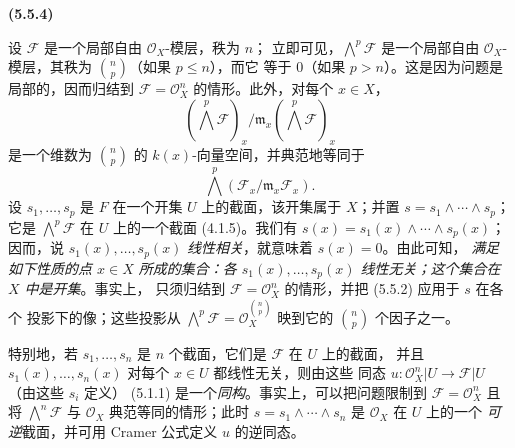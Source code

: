 \documentclass[UTF8,fontset=none,11pt,oneside,openany]{ctexbook}
\newenvironment{env}[1][]{%
  \par\medskip\noindent\textbf{(#1)}\ %
}{\par}
\let\EGAOriginalLabel\label
\renewcommand{\label}[1]{\phantomsection\EGAOriginalLabel{#1}}
\begin{document}
\begin{env}[5.5.4]
\label{0.5.5.4-fr}
设 $\mathcal{F}$ 是一个局部自由 $\mathcal{O}_X$-模层，秩为 $n$；
立即可见，$\bigwedge^p\mathcal{F}$ 是一个局部自由
$\mathcal{O}_X$-模层，其秩为 $\binom{n}{p}$（如果 $p\leq n$），而它
等于 $0$（如果 $p>n$）。这是因为问题是局部的，因而归结到
$\mathcal{F}=\mathcal{O}_X^n$ 的情形。此外，对每个 $x\in X$，
\[
  (\bigwedge^p\mathcal{F})_x/
  \mathfrak{m}_x(\bigwedge^p\mathcal{F})_x
\]
是一个维数为 $\binom{n}{p}$ 的 $k(x)$-向量空间，并典范地等同于
\[
  \bigwedge^p(\mathcal{F}_x/\mathfrak{m}_x\mathcal{F}_x).
\]
设 $s_1,\ldots,s_p$ 是
$F$ 在一个开集 $U$ 上的截面，该开集属于 $X$；并置
$s=s_1\wedge\cdots\wedge s_p$；它是
$\bigwedge^p\mathcal{F}$ 在 $U$ 上的一个截面 (4.1.5)。我们有
$s(x)=s_1(x)\wedge\cdots\wedge s_p(x)$；因而，说
$s_1(x),\ldots,s_p(x)$ \emph{线性相关}，就意味着 $s(x)=0$。由此可知，
\emph{满足如下性质的点 $x\in X$ 所成的集合：各
$s_1(x),\ldots,s_p(x)$ 线性无关；这个集合在 $X$ 中是开集}。事实上，
只须归结到
$\mathcal{F}=\mathcal{O}_X^n$ 的情形，并把 (5.5.2) 应用于 $s$ 在各个
投影下的像；这些投影从
$\bigwedge^p\mathcal{F}=\mathcal{O}_X^{\binom{n}{p}}$ 映到它的
$\binom{n}{p}$ 个因子之一。

特别地，若 $s_1,\ldots,s_n$ 是 $n$ 个截面，它们是 $\mathcal{F}$ 在
$U$ 上的截面，
并且 $s_1(x),\ldots,s_n(x)$ 对每个 $x\in U$ 都线性无关，则由这些
同态 $u:\mathcal{O}_X^n|U\to\mathcal{F}|U$（由这些 $s_i$ 定义）
(5.1.1) 是一个\emph{同构}。事实上，可以把问题限制到
$\mathcal{F}=\mathcal{O}_X^n$ 且将 $\bigwedge^n\mathcal{F}$ 与
$\mathcal{O}_X$ 典范等同的情形；此时
$s=s_1\wedge\cdots\wedge s_n$ 是 $\mathcal{O}_X$ 在 $U$ 上的一个
\emph{可逆}截面，并可用 Cramer 公式定义 $u$ 的逆同态。
\end{env}
\end{document}
